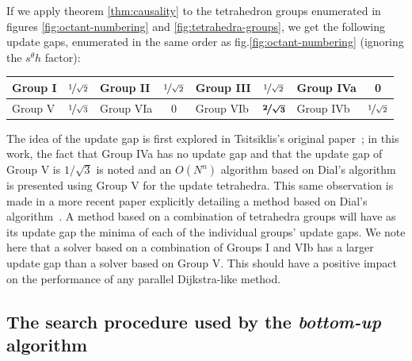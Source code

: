 \documentclass[smallcondensed]{svjour3}
\begin{document}
If we apply theorem \ref{thm:causality} to the tetrahedron groups
enumerated in figures \ref{fig:octant-numbering} and
\ref{fig:tetrahedra-groups}, we get the following update gaps,
enumerated in the same order as fig.\@ \ref{fig:octant-numbering}
(ignoring the $s^\theta h$ factor): \vspace{0.5em}
\begin{center}
  \begin{tabular}{lc|lc|lc|lc}
    Group I & $\nicefrac{1}{\sqrt{2}}$ & Group II & $\nicefrac{1}{\sqrt{2}}$ & Group III & $\nicefrac{1}{\sqrt{2}}$ & Group IVa & 0 \\
    \midrule
    Group V & $\nicefrac{1}{\sqrt{3}}$ & Group VIa & 0 & Group VIb & $\boldsymbol{\nicefrac{2}{\sqrt{3}}}$ & Group IVb & $\nicefrac{1}{\sqrt{2}}$
  \end{tabular}
\end{center}
\vspace{0.5em} The idea of the update gap is first explored in
Tsitsiklis's original paper~\cite{tsitsiklis1995efficient}; in this
work, the fact that Group IVa has no update gap and that the update
gap of Group V is $1/\sqrt{3}$ is noted and an $O(N^n)$ algorithm
based on Dial's algorithm is presented using Group V for the update
tetrahedra. This same observation is made in a more recent paper
explicitly detailing a method based on Dial's
algorithm~\cite{kim2001calo}. A method based on a combination of
tetrahedra groups will have as its update gap the minima of each of
the individual groups' update gaps. We note here that a solver based
on a combination of Groups I and VIb has a larger update gap than a
solver based on Group V. This should have a positive impact on the
performance of any parallel Dijkstra-like method.

\subsection{The search procedure used by the \emph{bottom-up}
  algorithm}\label{ssec:bottom-up-search}
\end{document}
